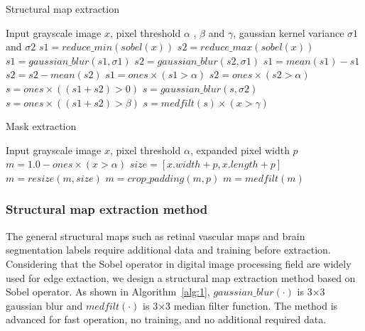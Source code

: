 \documentclass[runningheads]{llncs}
\begin{document}
	\vspace{-0.2cm}
	\begin{algorithm}[thbp!]
		\caption{Structural map extraction}
		\label{alg:1}
		\begin{multicols}{2}
			\begin{algorithmic}[1]
				\State Input grayscale image $x$,
				pixel threshold $\alpha$ , $\beta$ and $\gamma$,
				gaussian kernel variance $\sigma 1$ and $\sigma 2$
				\State $s1 = reduce\_min(sobel(x))$
				\State $s2 = reduce\_max(sobel(x))$
				\State $s1 = gaussian\_blur(s1,\sigma 1)$
				\State $s2 = gaussian\_blur(s2,\sigma 1)$
				\State $s1 = mean(s1) - s1$
				\State $s2 = s2 - mean(s2)$
				\State $s1 = ones \times (s1 > \alpha)$
				\State $s2 = ones \times (s2 > \alpha)$
				\State $s = ones \times ((s1 + s2)> 0)$
				\State $s = gaussian\_blur(s,\sigma 2)$
				\State $s = ones \times ((s1 + s2)> \beta)$
				\State $s = medfilt(s)\times (x > \gamma)$
			\end{algorithmic} 
		\end{multicols}
	\vspace{-0.3cm}
	\end{algorithm}
	\vspace{-0.5cm}
	\vspace{-0.5cm}
	\begin{algorithm}[thbp!]
	\caption{Mask extraction}
	\label{alg:2}
	\setstretch{0.8}
	\begin{multicols}{2}
		\begin{algorithmic}[1]
			\State Input grayscale image $x$, pixel threshold $\alpha$, expanded pixel width $p$
			\State $m = 1.0 - ones \times (x > \alpha)$
			\State $size=[x.width+p, x.length+p]$
			\State $m = resize(m, size)$
			\State $m = crop\_padding(m,p)$
			\State $m = medfilt(m)$
		\end{algorithmic} 
	\end{multicols}
	\vspace{-0.3cm}
	\end{algorithm}
	\vspace{-0.5cm}
	\subsubsection{Structural map extraction method}
	The general structural maps such as retinal vascular maps\cite{41costa2017towards} and brain segmentation labels \cite{4shin2018medical} require additional data and training before extraction. Considering that the Sobel operator\cite{147Sobel} in digital image processing field are widely used for edge extaction, we design a structural map extraction method based on Sobel operator. As shown in Algorithm~\ref{alg:1}, $gaussian\_blur(\cdot)$ is 3$\times$3 gaussian blur and $medfilt(\cdot)$ is 3$\times$3 median filter function. The method is advanced for fast operation, no training, and no additional required data. 
	
\end{document}
